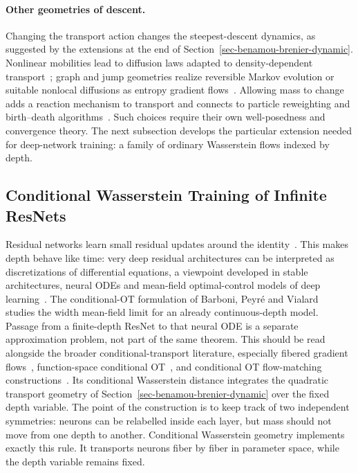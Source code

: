 \paragraph{Other geometries of descent.}\label{par-generalized-flow-perspectives}
Changing the transport action changes the steepest-descent dynamics, as suggested by the extensions at the end of Section~\ref{sec-benamou-brenier-dynamic}. Nonlinear mobilities lead to diffusion laws adapted to density-dependent transport~\citep{dolbeault2009new}; graph and jump geometries realize reversible Markov evolution or suitable nonlocal diffusions as entropy gradient flows~\citep{Maas2011,Erbar2012JumpEntropy}. Allowing mass to change adds a reaction mechanism to transport and connects to particle reweighting and birth--death algorithms~\citep{gallouet2017jko,Chizat2021GradientMethodsMeasures,Rotskoff2019BirthDeath}. Such choices require their own well-posedness and convergence theory. The next subsection develops the particular extension needed for deep-network training: a family of ordinary Wasserstein flows indexed by depth.

\subsection{Conditional Wasserstein Training of Infinite ResNets}
\label{sec-conditional-wasserstein-resnets}
Residual networks learn small residual updates around the identity~\citep{HeZhangRenSun2016ResNet}. This makes depth behave like time: very deep residual architectures can be interpreted as discretizations of differential equations, a viewpoint developed in stable architectures, neural ODEs and mean-field optimal-control models of deep learning~\citep{HaberRuthotto2017StableArchitectures,LuZhongLiDong2018BeyondFiniteLayers,Chen2018NeuralODE,EHanLi2019MeanFieldDeepLearning}. The conditional-OT formulation of Barboni, Peyr\'e and Vialard~\citep{BarboniPeyreVialard2024ConditionalResNets} studies the width mean-field limit for an already continuous-depth model. Passage from a finite-depth ResNet to that neural ODE is a separate approximation problem, not part of the same theorem. This should be read alongside the broader conditional-transport literature, especially fibered gradient flows~\citep{PeszekPoyato2023FiberedOptimalTransport}, function-space conditional OT~\citep{HosseiniHsuTaghvaei2023ConditionalFunctionSpaces}, and conditional OT flow-matching constructions~\citep{ChemseddineHagemannSteidlWald2024ConditionalWasserstein,KerriganMiglioriniSmyth2024DynamicConditionalOT}. Its conditional Wasserstein distance integrates the quadratic transport geometry of Section~\ref{sec-benamou-brenier-dynamic} over the fixed depth variable. The point of the construction is to keep track of two independent symmetries: neurons can be relabelled inside each layer, but mass should not move from one depth to another. Conditional Wasserstein geometry implements exactly this rule. It transports neurons fiber by fiber in parameter space, while the depth variable remains fixed.

